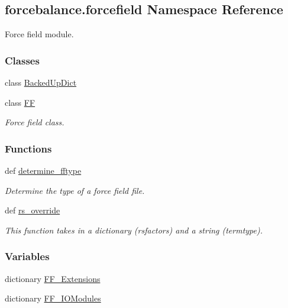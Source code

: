 \hypertarget{namespaceforcebalance_1_1forcefield}{\subsection{forcebalance.\-forcefield Namespace Reference}
\label{namespaceforcebalance_1_1forcefield}
}


Force field module.  


\subsubsection*{Classes}
\begin{DoxyCompactItemize}
\item 
class \hyperlink{classforcebalance_1_1forcefield_1_1BackedUpDict}{Backed\-Up\-Dict}
\item 
class \hyperlink{classforcebalance_1_1forcefield_1_1FF}{F\-F}
\begin{DoxyCompactList}\small\item\em Force field class. \end{DoxyCompactList}\end{DoxyCompactItemize}
\subsubsection*{Functions}
\begin{DoxyCompactItemize}
\item 
def \hyperlink{namespaceforcebalance_1_1forcefield_a99c9997d5158a04be089f291bd6f99bd}{determine\-\_\-fftype}
\begin{DoxyCompactList}\small\item\em Determine the type of a force field file. \end{DoxyCompactList}\item 
def \hyperlink{namespaceforcebalance_1_1forcefield_ab1a855bace20dd5e45928467e2a133f1}{rs\-\_\-override}
\begin{DoxyCompactList}\small\item\em This function takes in a dictionary (rsfactors) and a string (termtype). \end{DoxyCompactList}\end{DoxyCompactItemize}
\subsubsection*{Variables}
\begin{DoxyCompactItemize}
\item 
dictionary \hyperlink{namespaceforcebalance_1_1forcefield_abc5e12aa78c5742f028b954ede086c51}{F\-F\-\_\-\-Extensions}
\item 
dictionary \hyperlink{namespaceforcebalance_1_1forcefield_a3beac9806e0438b79b9ae60a47c7b131}{F\-F\-\_\-\-I\-O\-Modules}
\end{DoxyCompactItemize}


